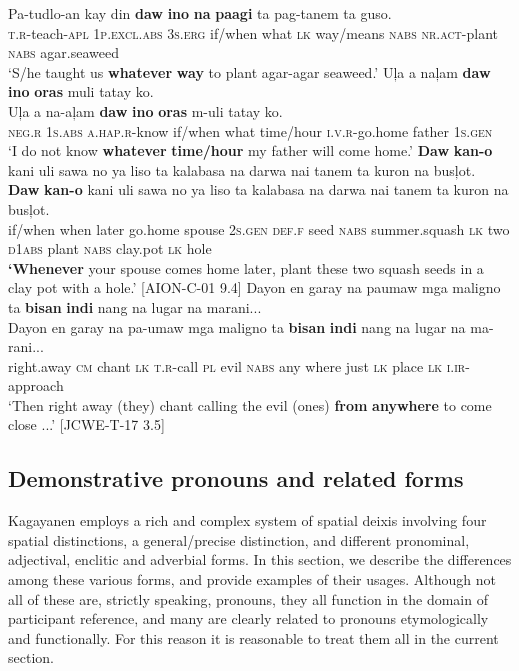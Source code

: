  \gll Pa-tudlo-an  kay  din  \textbf{daw}  \textbf{ino}  \textbf{na}  \textbf{paagi} ta  pag-tanem  ta  guso. \\
\textsc{t.r}-teach\textsc{-apl}  1\textsc{p.excl.abs}  3\textsc{s.erg}  if/when  what  \textsc{lk}  way/means
\textsc{nabs}  \textsc{nr.act}-plant  \textsc{nabs}  agar.seaweed \\
\glt `S/he taught us \textbf{whatever} \textbf{way} to plant agar-agar seaweed.’
\z
\ea
Uļa  a  naļam  \textbf{daw}  \textbf{ino}  \textbf{oras}  muli  tatay  ko. \\\smallskip
 \gll Uļa  a  na-aļam  \textbf{daw}  \textbf{ino}  \textbf{oras}  m-uli  tatay  ko. \\
\textsc{neg.r}  \textsc{1s.abs}  \textsc{a.hap.r-}know  if/when what  time/hour  \textsc{i.v.r}-go.home father  1\textsc{s.gen} \\
\glt ‘I do not know \textbf{whatever} \textbf{time/hour} my father will come home.’
\z
\ea
\textbf{Daw}  \textbf{kan-o}  kani  uli  sawa  no  ya  liso  ta  kalabasa  na  darwa  nai  tanem  ta  kuron  na  busļot. \\\smallskip
 \gll \textbf{Daw}  \textbf{kan-o}  kani  uli  sawa  no  ya  liso  ta  kalabasa  na  darwa  nai  tanem  ta  kuron  na  busļot. \\
if/when  when  later  go.home  spouse  2\textsc{s.gen}  \textsc{def.f}  seed  \textsc{nabs} summer.squash  \textsc{lk}  two  \textsc{d}1\textsc{abs}  plant  \textsc{nabs} clay.pot  \textsc{lk}  hole \\
\glt \textbf{‘Whenever} your spouse comes home later, plant these two squash seeds in a clay pot with a hole.’ [AION-C-01 9.4]
\z
\ea
Dayon  en  garay  na  paumaw  mga  maligno  ta  \textbf{bisan}  \textbf{indi} nang  na lugar  na  marani... \\\smallskip
 \gll Dayon  en  garay  na  pa-umaw  mga  maligno  ta  \textbf{bisan}  \textbf{indi} nang  na lugar  na  ma-rani... \\
right.away  \textsc{cm}  chant  \textsc{lk}  \textsc{t.r}-call  \textsc{pl}  evil  \textsc{nabs}  any  where just  \textsc{lk}
place  \textsc{lk}  \textsc{i.ir-}approach \\
\glt `Then right away (they) chant calling the evil (ones) \textbf{from} \textbf{anywhere} to come close ...’ [JCWE-T-17 3.5]
\z

\subsection{Demonstrative pronouns and related forms}
\label{sec:deicticpronouns}
Kagayanen employs a rich and complex system of spatial deixis involving four spatial distinctions, a general/precise distinction, and different pronominal, adjectival, enclitic and adverbial forms. In this section, we describe the differences among these various forms, and provide examples of their usages. Although not all of these are, strictly speaking, pronouns, they all function in the domain of participant reference, and many are clearly related to pronouns etymologically and functionally. For this reason it is reasonable to treat them all in the current section.

